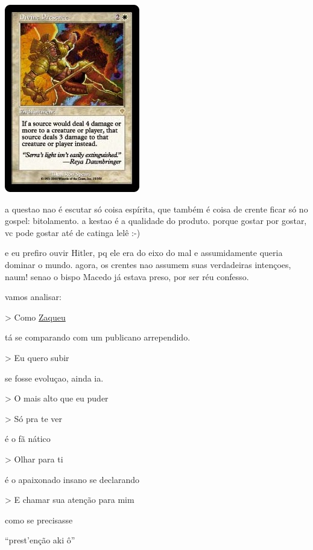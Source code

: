 \documentclass[12pt,a4paper]{article}
\begin{document}
			\begin{center}
			\includegraphics{presence}
			\end{center}

			\begin{flushright}
			\end{flushright}

a questao nao \'e escutar s\'o coisa esp\'irita, que tamb\'em \'e coisa de crente ficar s\'o no gospel: bitolamento. a kestao \'e a qualidade do produto. porque gostar por gostar, vc pode gostar at\'e de catinga lel\^e :-)

e eu prefiro ouvir Hitler, pq ele era do eixo do mal e assumidamente queria dominar o mundo. agora, os crentes nao assumem suas verdadeiras inten\c{c}oes, naum! senao o bispo Macedo j\'a estava preso, por ser r\'eu confesso.

vamos analisar:

> Como \href{http://letras.terra.com.br/regis-danese/1438692/}{Zaqueu}

t\'a se comparando com um publicano arrependido.

> Eu quero subir

se fosse evolu\c{c}ao, ainda ia.

> O mais alto que eu puder

> S\'o pra te ver

\'e o f\~a n\'atico

> Olhar para ti

\'e o apaixonado insano se declarando

> E chamar sua aten\c{c}\~ao para mim

como se precisasse

\textquotedblleft prest'en\c{c}\~ao aki \^o\textquotedblright
\end{document}
